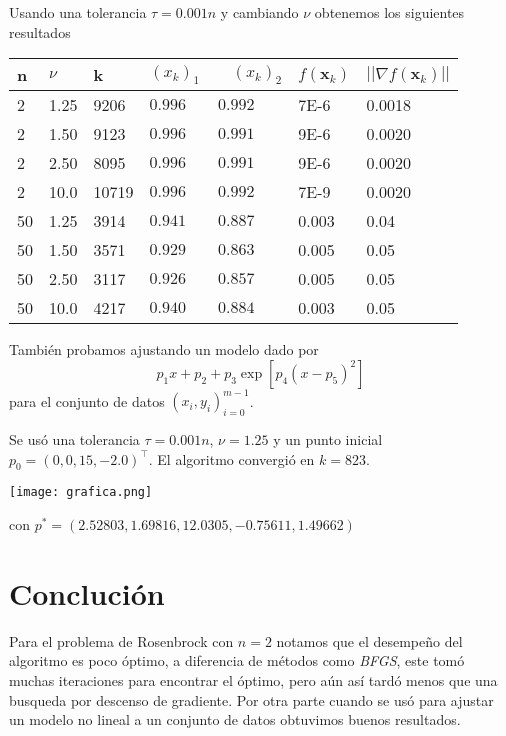 \documentclass{article}
\begin{document}
\begin{multicols}{2}
Usando una tolerancia $\tau = 0.001 n$ y cambiando $\nu$ obtenemos los siguientes resultados
\begin{table}[H]
\small
\centering
\label{my-label}
\begin{tabular}{|l|l|l|l|l|l|}
\hline
n & $\nu$ & k & $(x_{k})_1\qquad (x_{k})_2$ & $f(\boldsymbol{x}_k)$ & $||\nabla f(\boldsymbol{x}_k)||$ \\ \hline
2  & 1.25 & 9206  & $0.996\qquad0.992$ & 7E-6  & 0.0018 \\
2  & 1.50 & 9123  & $0.996\qquad0.991$ & 9E-6  & 0.0020 \\
2  & 2.50 & 8095  & $0.996\qquad0.991$ & 9E-6  & 0.0020 \\
2  & 10.0 & 10719 & $0.996\qquad0.992$ & 7E-9  & 0.0020 \\
50 & 1.25 & 3914  & $0.941\qquad0.887$ & 0.003 & 0.04 \\
50 & 1.50 & 3571  & $0.929\qquad0.863$ & 0.005 & 0.05 \\
50 & 2.50 & 3117  & $0.926\qquad0.857$ & 0.005 & 0.05 \\
50 & 10.0 & 4217  & $0.940\qquad0.884$ & 0.003 & 0.05 \\ \hline
\end{tabular}
\end{table}

También probamos ajustando un modelo dado por
$$ p_1x + p_2 + p_3 \exp[p_4(x - p_5)^2] $$
para el conjunto de datos ${(x_i, y_i)}_{i=0}^{m-1}$.

Se usó una tolerancia $\tau = 0.001 n$, $\nu = 1.25$ y un punto inicial $p_0 = (0, 0, 15, -2.0)^\intercal$. El algoritmo convergió en $k = 823$.

\texttt{[image: grafica.png]}

con $p^* = (2.52803, 1.69816, 12.0305, -0.75611, 1.49662)$

\section{Conclución}

Para el problema de Rosenbrock con $n = 2$ notamos que el desempeño del algoritmo es poco óptimo, a diferencia de métodos como \emph{BFGS}, este tomó muchas iteraciones para encontrar el óptimo, pero aún así tardó menos que una busqueda por descenso de gradiente. Por otra parte cuando se usó para ajustar un modelo no lineal a un conjunto de datos obtuvimos buenos resultados.


\newpage

\end{multicols}
\end{document}
